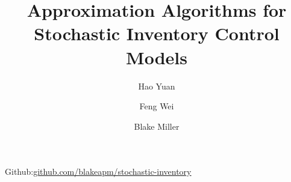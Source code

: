 \documentclass[twoside]{article}
\title{\vspace{-15mm}\fontsize{24pt}{10pt}\selectfont\textbf{Approximation Algorithms for Stochastic Inventory Control Models}} %
\author{Hao Yuan
\and
Feng Wei
\and
Blake Miller
}
\begin{document}
\maketitle %
\thispagestyle{fancy} %




\begin{center}
{\ttfamily Github:\href{https://github.com/blakeapm/stochastic-inventory}{github.com/blakeapm/stochastic-inventory}}
\end{center}

\end{document}
